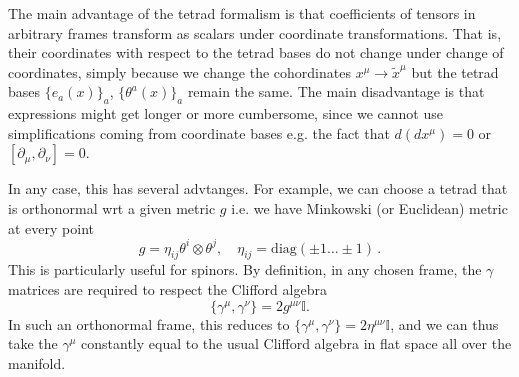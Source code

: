 \documentclass[../geometry_main.tex]{subfiles}
\begin{document}
\begin{mytheorem}
The main advantage of the tetrad formalism is that coefficients of tensors in arbitrary frames transform as scalars under coordinate transformations.
That is, their coordinates with respect to the tetrad bases do not change under change of coordinates, simply because we change the cohordinates $x^\mu\to \tilde{x}^\mu$ but the tetrad bases $\{e_a(x)\}_a$, $\{\theta^a(x)\}_a$ remain the same.
The main disadvantage is that expressions might get longer or more cumbersome, since we cannot use simplifications coming from coordinate bases e.g. the fact that $d (dx^\mu) = 0$ or $[\partial_\mu, \partial_\nu] = 0$.

In any case, this has several advtanges.
For example, we can choose a tetrad that is orthonormal wrt a given metric $g$ i.e. we have Minkowski (or Euclidean) metric at every point
\begin{equation}
    g = \eta_{ij} \theta^i \otimes \theta^j,\quad \eta_{ij}=\text{diag}(\pm1\dots \pm1)\,.
\end{equation}
This is particularly useful for spinors.
By definition, in any chosen frame, the $\gamma$ matrices are required to respect the Clifford algebra
\begin{equation}
    \{\gamma^\mu, \gamma^\nu\} = 2 g^{\mu\nu} \mathbb{I}.
\end{equation}
In such an orthonormal frame, this reduces to $\{\gamma^\mu, \gamma^\nu\} = 2 \eta^{\mu\nu} \mathbb{I}$, and we can thus take the $\gamma^\mu$ constantly equal to the usual Clifford algebra in flat space all over the manifold.
\end{mytheorem}
\end{document}
